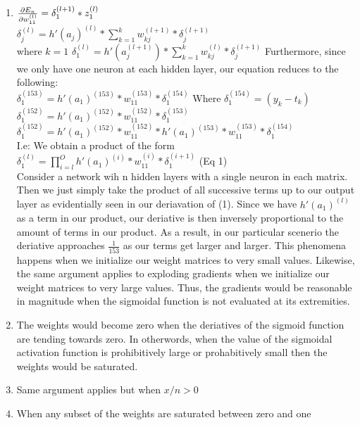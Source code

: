 \documentclass[12pt,letterpaper]{article}
\begin{document}
	
\begin{enumerate}

\item 
	$\pdv{E_{n}}{w_{11}^{(l)}}=\delta_{1}^{(l+1)}*z_{1}^{(l)}$
	\\
	$\delta_{j}^{(l)}=h'(a_{j})^{(l)}*\sum_{k=1}^{k}w_{kj}^{(l+1)}*\delta_{j}^{(l+1)}$
	\\
	where $k=1$
	$\delta_{1}^{(l)}=h'(a_{j}^{(l+1)})*\sum_{k=1}^{k}w_{kj}^{(l)}*\delta_{j}^{(l+1)}$
	Furthermore, since we only have one neuron at each hidden layer, our equation reduces to the following:
	\\
	$\delta_{1}^{(153)}=h'(a_{1})^{(153)}*w_{11}^{(153)}*\delta_{1}^{(154)}$
	Where $\delta_{1}^{(154)}=(y_{k}-t_{k})$
	\\
	$\delta_{1}^{(152)}=h'(a_{1})^{(152)}*w_{11}^{(152)}*\delta_{1}^{(153)}$
	\\
	$\delta_{1}^{(152)}=h'(a_{1})^{(152)}*w_{11}^{(152)}*h'(a_{1})^{(153)}*w_{11}^{(153)}*\delta_{1}^{(154)}$
	\\
	I.e: We obtain a product of the form
	\\
	$\delta_{1}^{(l)}=\prod_{i=l}^{O}h'(a_{1})^{(i)}*w_{11}^{(i)}*\delta_{1}^{(i+1)}$ (Eq 1)
	\\
	Consider a network wih n hidden layers with a single neuron in each matrix. Then we just simply
	take the product of all successive terms up to our output layer as evidentially seen in our deriavation
	of (1). Since we have $h'(a_{1})^{(l)}$ as a term in our product, our deriative is then inversely proportional
	to the amount of terms in our product. As a result, in our particular scenerio the deriative approaches $\frac{1}{153}$
	as our terms get larger and larger. This phenomena happens when we initialize our weight matrices to very small values.
	Likewise, the same argument applies to exploding gradients when we initialize our weight matrices to very large values.
	Thus, the gradients would be reasonable in magnitude when the sigmoidal function is not evaluated at its extremities.
\item
	The weights would become zero when the deriatives of the sigmoid function are tending towards zero.
	In otherwords, when the value of the sigmoidal activation function is prohibitively large
	or prohabitively small then the weights would be saturated. 

\item Same argument applies but when $x/n > 0$

\item When any subset of the weights are saturated between zero and one 

 
\end{enumerate}
\end{document}

